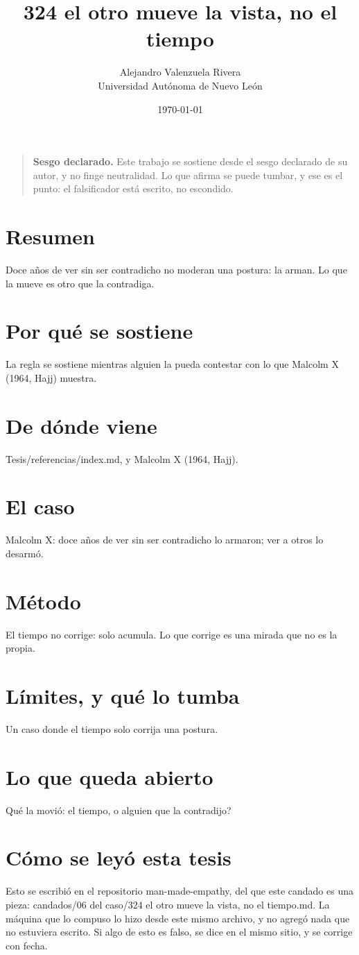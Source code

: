 \documentclass[11pt,a4paper]{article}
\title{324 el otro mueve la vista, no el tiempo}
\author{Alejandro Valenzuela Rivera\\\small Universidad Autónoma de Nuevo León}
\date{\today}
\begin{document}
\maketitle

\begin{quote}
\textbf{Sesgo declarado.} Este trabajo se sostiene desde el sesgo declarado de su autor, y no finge neutralidad. Lo que afirma se puede tumbar, y ese es el punto: el falsificador está escrito, no escondido.
\end{quote}

\section*{Resumen}
Doce años de ver sin ser contradicho no moderan una postura: la arman. Lo que la mueve es otro que la contradiga.

\section{Por qué se sostiene}
La regla se sostiene mientras alguien la pueda contestar con lo que Malcolm X (1964, Hajj) muestra.

\section{De dónde viene}
Tesis/referencias/index.md, y Malcolm X (1964, Hajj).

\section{El caso}
Malcolm X: doce años de ver sin ser contradicho lo armaron; ver a otros lo desarmó.

\section{Método}
El tiempo no corrige: solo acumula. Lo que corrige es una mirada que no es la propia.

\section{Límites, y qué lo tumba}
Un caso donde el tiempo solo corrija una postura.

\section{Lo que queda abierto}
\textquestiondown{}Qué la movió: el tiempo, o alguien que la contradijo?

\section*{Cómo se leyó esta tesis}
Esto se escribió en el repositorio man-made-empathy, del que este candado es una pieza: candados/06 del caso/324 el otro mueve la vista, no el tiempo.md. La máquina que lo compuso lo hizo desde este mismo archivo, y no agregó nada que no estuviera escrito. Si algo de esto es falso, se dice en el mismo sitio, y se corrige con fecha.
\end{document}
